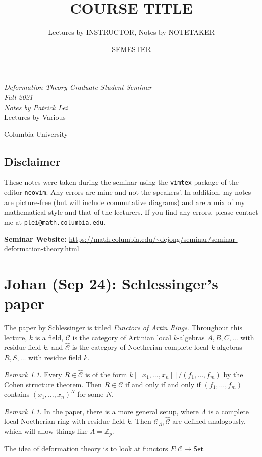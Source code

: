\documentclass[leqno, openany]{memoir}
\title{COURSE TITLE}
\author{Lectures by INSTRUCTOR, Notes by NOTETAKER}
\date{SEMESTER}
\theoremstyle{definition}
\theoremstyle{remark}
\newtheorem{rmk}[thm]{Remark}
\theoremstyle{plain}
\theoremstyle{definition}
\theoremstyle{remark}
\newcommand{\Z}{\mathbb{Z}}
\newcommand{\mc}[1]{\mathcal{#1}}
\newcommand{\ms}[1]{\mathsf{#1}}
\newcommand{\wh}[1]{\widehat{#1}}
\newcommand*{\titleSW}
    {\begingroup%
    \raggedleft
    \vspace*{\baselineskip}
    {\Huge\itshape Deformation Theory Graduate Student Seminar \\ Fall 2021}\\[\baselineskip]
    {\large\itshape Notes by Patrick Lei}\\[0.2\textheight]
    {\Large Lectures by Various}\par
    \vfill
    {\Large \sffamily Columbia University}
    \vspace*{\baselineskip}
\endgroup}
\begin{document}
    
\begin{titlingpage}
\titleSW
\end{titlingpage}

\thispagestyle{empty}
\section*{Disclaimer}%
\label{sec:disclaimer}

These notes were taken during the seminar using the \texttt{vimtex} package of the editor \texttt{neovim}. 
Any errors are mine and not the speakers'. 
In addition, my notes are picture-free (but will include commutative diagrams) and are a mix of my mathematical style and that of the lecturers.
If you find any errors, please contact me at \texttt{plei@math.columbia.edu}.

\vspace*{1cm}

\noindent\textbf{Seminar Website:}  \url{https://math.columbia.edu/~dejong/seminar/seminar-deformation-theory.html}
\newpage

\tableofcontents

\chapter{Johan (Sep 24): Schlessinger's paper}%
\label{cha:johan_sep_24_schlessinger_s_paper}

The paper by Schlessinger is titled \textit{Functors of Artin Rings}. Throughout this lecture, $k$ is a field, $\mc{C}$ is the category of Artinian local $k$-algebras $A, B, C, \ldots$ with residue field $k$, and $\wh{\mc{C}}$ is the category of Noetherian complete local $k$-algebras $R, S, \ldots$ with residue field $k$.

\begin{rmk}
    Every $R \in \wh{\mc{C}}$ is of the form $k[[x_1, \ldots, x_n]] / (f_1, \ldots, f_m)$ by the Cohen structure theorem. Then $R \in \mc{C}$ if and only if and only if $(f_1, \ldots, f_m)$ contains ${(x_1, \ldots, x_n)}^N$ for some $N$.
\end{rmk}

\begin{rmk}
    In the paper, there is a more general setup, where $\Lambda$ is a complete local Noetherian ring with residue field $k$. Then $\mc{C}_{\Lambda}, \wh{\mc{C}}$ are defined analogously, which will allow things like $\Lambda = \Z_p$.
\end{rmk}

The idea of deformation theory is to look at functors $F \colon \mc{C} \to \ms{Set}$.
\end{document}
